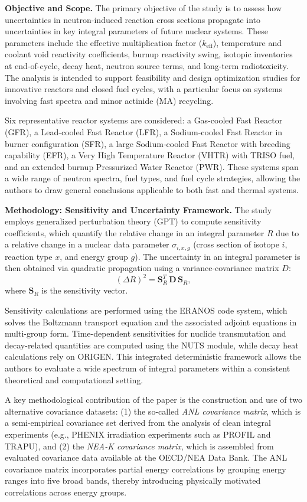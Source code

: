 \textbf{Objective and Scope.}  
The primary objective of the study is to assess how uncertainties in neutron-induced reaction cross sections propagate into 
uncertainties in key integral parameters of future nuclear systems. These parameters include the effective multiplication 
factor ($k_{\text{eff}}$), temperature and coolant void reactivity coefficients, burnup reactivity swing, isotopic inventories at 
end-of-cycle, decay heat, neutron source terms, and long-term radiotoxicity. The analysis is intended to support feasibility and 
design optimization studies for innovative reactors and closed fuel cycles, with a particular focus on systems involving fast 
spectra and minor actinide (MA) recycling.

Six representative reactor systems are considered: a Gas-cooled Fast Reactor (GFR), a Lead-cooled Fast Reactor (LFR), a 
Sodium-cooled Fast Reactor in burner configuration (SFR), a large Sodium-cooled Fast Reactor with breeding capability (EFR), 
a Very High Temperature Reactor (VHTR) with TRISO fuel, and an extended burnup Pressurized Water Reactor (PWR). These systems 
span a wide range of neutron spectra, fuel types, and fuel cycle strategies, allowing the authors to draw general conclusions 
applicable to both fast and thermal systems.

\textbf{Methodology: Sensitivity and Uncertainty Framework.}  
The study employs generalized perturbation theory (GPT) to compute sensitivity coefficients, which quantify the relative 
change in an integral parameter $R$ due to a relative change in a nuclear data parameter $\sigma_{i,x,g}$ 
(cross section of isotope $i$, reaction type $x$, and energy group $g$). The uncertainty in an integral parameter is then 
obtained via quadratic propagation using a variance-covariance matrix $D$:
\[
(\Delta R)^2 = \mathbf{S}_R^T \, \mathbf{D} \, \mathbf{S}_R,
\]
where $\mathbf{S}_R$ is the sensitivity vector.

Sensitivity calculations are performed using the ERANOS code system, which solves the Boltzmann transport equation and 
the associated adjoint equations in multi-group form. Time-dependent sensitivities for nuclide transmutation and decay-related 
quantities are computed using the NUTS module, while decay heat calculations rely on ORIGEN. This integrated deterministic 
framework allows the authors to evaluate a wide spectrum of integral parameters within a consistent theoretical and computational 
setting.

A key methodological contribution of the paper is the construction and use of two alternative covariance datasets: 
(1) the so-called \emph{ANL covariance matrix}, which is a semi-empirical covariance set derived from the analysis of clean 
integral experiments (e.g., PHENIX irradiation experiments such as PROFIL and TRAPU), and (2) the \emph{NEA-K covariance matrix}, 
which is assembled from evaluated covariance data available at the OECD/NEA Data Bank. The ANL covariance matrix incorporates 
partial energy correlations by grouping energy ranges into five broad bands, thereby introducing physically motivated correlations 
across energy groups.

